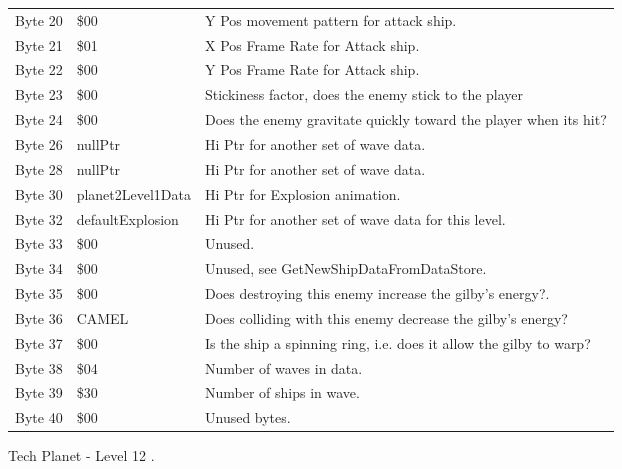\begin{figure}[H]
{\begin{adjustbox}{width=12cm}
\begin{tabular}{lll}
 Byte 20 & \$00               & Y Pos movement pattern for attack ship.                            \\
 Byte 21 & \$01               & X Pos Frame Rate for Attack ship.                                  \\
 Byte 22 & \$00               & Y Pos Frame Rate for Attack ship.                                  \\
 Byte 23 & \$00               & Stickiness factor, does the enemy stick to the player              \\
 Byte 24 & \$00               & Does the enemy gravitate quickly toward the player when its hit?   \\
 Byte 26 & nullPtr           & Hi Ptr for another set of wave data.                               \\
 Byte 28 & nullPtr           & Hi Ptr for another set of wave data.                               \\
 Byte 30 & planet2Level1Data & Hi Ptr for Explosion animation.                                    \\
 Byte 32 & defaultExplosion  & Hi Ptr for another set of wave data for this level.                \\
 Byte 33 & \$00               & Unused.                                                            \\
 Byte 34 & \$00               & Unused, see GetNewShipDataFromDataStore.                           \\
 Byte 35 & \$00               & Does destroying this enemy increase the gilby's energy?.           \\
 Byte 36 & CAMEL             & Does colliding with this enemy decrease the gilby's energy?        \\
 Byte 37 & \$00               & Is the ship a spinning ring, i.e. does it allow the gilby to warp? \\
 Byte 38 & \$04               & Number of waves in data.                                           \\
 Byte 39 & \$30               & Number of ships in wave.                                           \\
 Byte 40 & \$00               & Unused bytes.                                                      \\
\bottomrule
\end{tabular}

  \end{adjustbox}

  }\caption*{Tech Planet - Level 12
.}
\end{figure}

